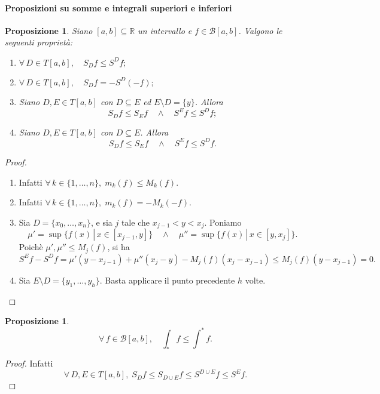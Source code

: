 \documentclass{article}
\theoremstyle{plain}
\newtheorem{prop}[thm]{Proposizione}
\theoremstyle{definition}
\theoremstyle{remark}
\begin{document}
\paragraph{Proposizioni su somme e integrali superiori e inferiori}
\begin{bxthm}
\begin{prop}
    Siano $[a,b]\subseteq\mathbb{R}$ un intervallo e $f\in\mathcal{B}[a,b]$. Valgono le seguenti proprietà:
    \begin{enumerate}
        \item $\forall\,D\in T[a,b],\quad S_Df\leq S^Df;$
        \item $\forall\,D\in T[a,b],\quad S_Df=-S^D(-f);$
        \item Siano $D,E\in T[a,b]$ con $D\subseteq E$ ed $E\setminus D=\{y\}$. Allora 
        \[S_Df\leq S_Ef\quad\land\quad S^Ef\leq S^Df;\]
        \item Siano $D,E\in T[a,b]$ con $D\subseteq E$. Allora 
        \[S_Df\leq S_Ef\quad\land\quad S^Ef\leq S^Df.\]
    \end{enumerate}
\end{prop}
\end{bxthm}
\begin{proof}\hfill
    \begin{enumerate}
        \item Infatti $\forall\,k\in\{1,\dots,n\},\;m_k(f)\leq M_k(f)$.
        \item Infatti $\forall\,k\in\{1,\dots,n\},\;m_k(f)=-M_k(-f)$.
        \item Sia $D=\{x_0,\dots,x_n\}$, e sia $j$ tale che $x_{j-1}<y<x_j$.
        Poniamo \[\mu'=\sup\{f(x)\,|\,x\in[x_{j-1},y]\}\quad\land\quad\mu''=\sup\{f(x)\,|\,x\in[y,x_j]\}.\]
        Poichè $\mu',\mu''\leq M_j(f)$, si ha
        \[S^Ef-S^Df=\mu'(y-x_{j-1})+\mu''(x_j-y)-M_j(f)(x_j-x_{j-1})\leq M_j(f)(y-x_{j-1})=0.\]
        \item Sia $E\setminus D=\{y_1,\dots,y_h\}$. Basta applicare il punto precedente $h$ volte.
    \end{enumerate}
\end{proof}

\vspace{10pt}

\begin{bxthm}
\begin{prop}
    \[\forall\,f\in\mathcal{B}[a,b],\quad\int_*f\leq\int^*f.\]
\end{prop}
\end{bxthm}
\begin{proof}
    Infatti
    \[\forall\,D,E\in T[a,b],\;S_Df\leq S_{D\cup E}f\leq S^{D\cup E}f\leq S^Ef.\]
\end{proof}
\end{document}
